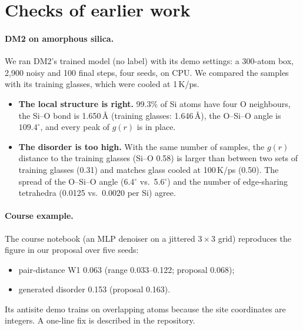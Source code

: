 \documentclass[10pt]{article}
\begin{document}
\section{Checks of earlier work}
\label{app:stage0}

\paragraph{DM2 on amorphous silica.} We ran DM2's trained model (no label) with its demo settings: a 300-atom box, 2{,}900 noisy and 100 final steps, four seeds, on CPU. We compared the samples with its training glasses, which were cooled at 1\,K/ps.
\begin{itemize}
\item \textbf{The local structure is right.} 99.3\% of Si atoms have four O neighbours, the Si--O bond is 1.650\,\AA{} (training glasses: 1.646\,\AA), the O--Si--O angle is $109.4^\circ$, and every peak of $g(r)$ is in place.
\item \textbf{The disorder is too high.} With the same number of samples, the $g(r)$ distance to the training glasses (Si--O 0.58) is larger than between two sets of training glasses (0.31) and matches glass cooled at 100\,K/ps (0.50). The spread of the O--Si--O angle (6.4$^\circ$ vs.\ 5.6$^\circ$) and the number of edge-sharing tetrahedra (0.0125 vs.\ 0.0020 per Si) agree.
\end{itemize}

\paragraph{Course example.} The course notebook (an MLP denoiser on a jittered $3\times3$ grid) reproduces the figure in our proposal over five seeds:
\begin{itemize}
\item pair-distance W1 0.063 (range 0.033--0.122; proposal 0.068);
\item generated disorder 0.153 (proposal 0.163).
\end{itemize}
Its antisite demo trains on overlapping atoms because the site coordinates are integers. A one-line fix is described in the repository.
\end{document}

